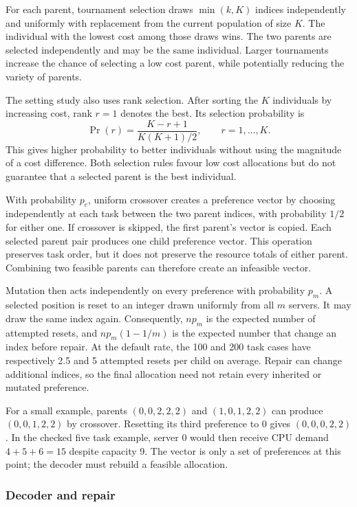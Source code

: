 \documentclass[10pt,a4paper]{article}
\begin{document}
For each parent, tournament selection draws $\min(k,K)$ indices independently
and uniformly with replacement from the current population of size $K$.
The individual with the lowest cost among those draws wins. The two parents
are selected independently and may be the same individual. Larger tournaments
increase the chance of selecting a low cost parent, while potentially reducing
the variety of parents.

The setting study also uses rank selection. After sorting the $K$ individuals
by increasing cost, rank $r=1$ denotes the best. Its selection probability is
\[
\Pr(r)=\frac{K-r+1}{K(K+1)/2},\qquad r=1,\ldots,K.
\]
This gives higher probability to better individuals without using the magnitude
of a cost difference. Both selection rules favour low cost allocations but do
not guarantee that a selected parent is the best individual.

With probability $p_c$, uniform crossover creates a preference vector by
choosing independently at each task between the two parent indices, with
probability $1/2$ for either one. If crossover is skipped, the first parent's
vector is copied. Each selected parent pair produces one child preference
vector. This operation preserves task order, but it does not preserve
the resource totals of either parent. Combining two feasible parents can therefore
create an infeasible vector.

Mutation then acts independently on every preference with probability $p_m$.
A selected position is reset to an integer drawn uniformly from all $m$ servers.
It may draw the same index again. Consequently, $np_m$ is the expected number
of attempted resets, and $np_m(1-1/m)$ is the expected number that change an
index before repair. At the default rate, the 100 and 200 task cases have
respectively 2.5 and 5 attempted resets per child on average. Repair can change
additional indices, so the final allocation need not retain every inherited
or mutated preference.

For a small example, parents $(0,0,2,2,2)$ and $(1,0,1,2,2)$ can produce
$(0,0,1,2,2)$ by crossover. Resetting its third preference to 0 gives
$(0,0,0,2,2)$. In the checked five task example, server 0 would then receive
CPU demand $4+5+6=15$ despite capacity 9. The vector is only a set of
preferences at this point; the decoder must rebuild a feasible allocation.

\subsubsection{Decoder and repair}
\end{document}
